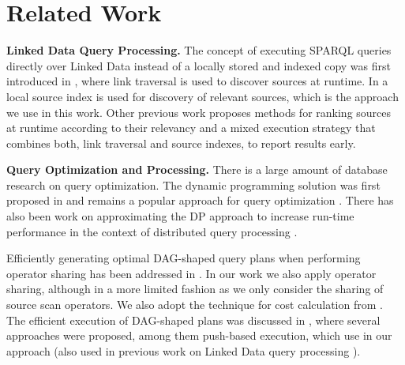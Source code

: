 \section{Related Work}
\label{sec:related}

\textbf{Linked Data Query Processing.} The concept of executing SPARQL
queries directly over Linked Data instead of a locally stored and
indexed copy was first introduced in \cite{hartig_executing_2009},
where link traversal is used to discover sources at runtime. In
\cite{harth_data_2010} a local source index  is used for discovery of
relevant sources, which is the approach we use in this work. Other previous work
\cite{ladwig_linked_2010,sihjoin_2011} proposes methods for ranking
sources at runtime according to their relevancy and a mixed execution
strategy that combines both, link traversal and source indexes, to
report results early. %






\textbf{Query Optimization and Processing.} There is a large amount of
database research on query optimization. The dynamic programming
solution was first proposed in \cite{selinger_access_1979} and remains a
popular approach for query optimization
\cite{moerkotte_dynamic_2008}. There has also
been work on approximating the DP approach to increase run-time
performance in the context of distributed query processing
\cite{kossmann_iterative_2000}.

Efficiently generating optimal DAG-shaped query plans when performing
operator sharing has been addressed in
\cite{neumann_generating_2009}. In our work we also apply operator
sharing, although in a more limited fashion as we only consider the
sharing of source scan operators. We also adopt the technique for cost
calculation from \cite{neumann_generating_2009}. The efficient
execution of DAG-shaped plans was discussed in \cite{Neumann_2005},
where several approaches were proposed, among them push-based
execution, which use in our approach (also used in previous work on
Linked Data query processing \cite{ladwig_linked_2010,sihjoin_2011}).

